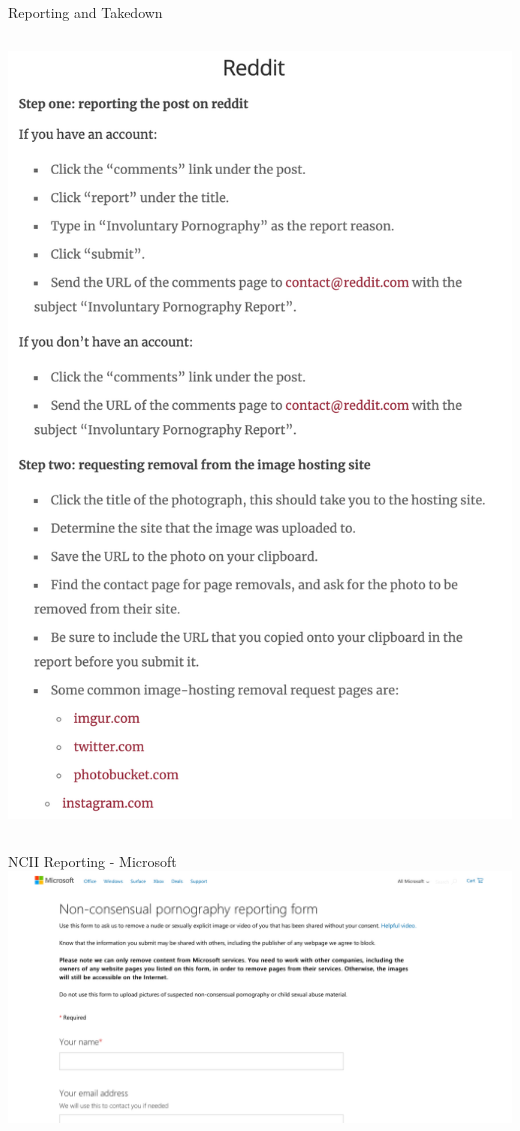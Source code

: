 \documentclass[nobackground,dvipsnames,table,aspectratio=169]{beamer}
\begin{document}
\begin{frame}{Reporting and Takedown}
\begin{columns}[T]
            \includegraphics[height=0.8\textheight]{ccri-removal-guide-reddit}
    \end{columns}
\end{frame}

\begin{frame}{NCII Reporting - Microsoft}
    \centering
    \includegraphics[width=\textwidth]{ncii-reporting-microsoft}
\end{frame}
\end{document}
